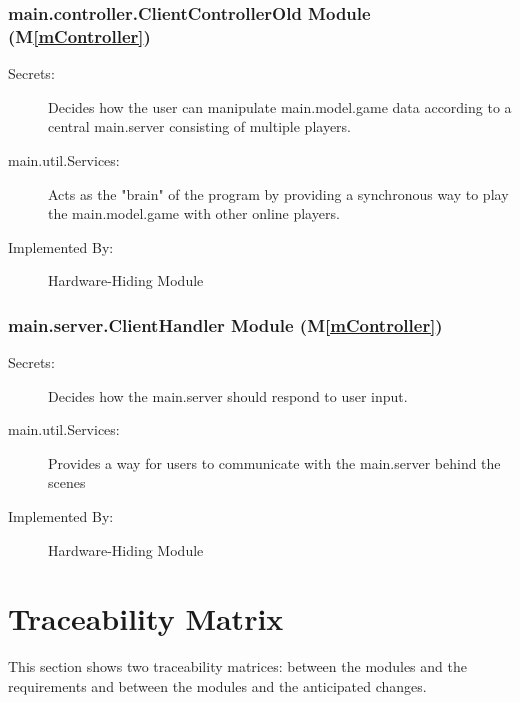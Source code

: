 \documentclass[12pt, titlepage]{article}
\newcommand{\mref}[1]{M\ref{#1}}
\begin{document}
\subsubsection{ main.controller.ClientControllerOld Module (\mref{mController})}
    \begin{description}
    \item[Secrets:] Decides how the user can manipulate main.model.game data according to a central main.server consisting of multiple players.
    \item[main.util.Services:] Acts as the "brain" of the program by providing a synchronous way to play the main.model.game with other online players.
    \item[Implemented By:] Hardware-Hiding Module
    \end{description}

\subsubsection{ main.server.ClientHandler Module (\mref{mController})}
    \begin{description}
    \item[Secrets:] Decides how the main.server should respond to user input.
    \item[main.util.Services:] Provides a way for users to communicate with the main.server behind the scenes
    \item[Implemented By:] Hardware-Hiding Module
    \end{description}



\section{Traceability Matrix} \label{SecTM}

This section shows two traceability matrices: between the modules and the
requirements and between the modules and the anticipated changes.
\end{document}
